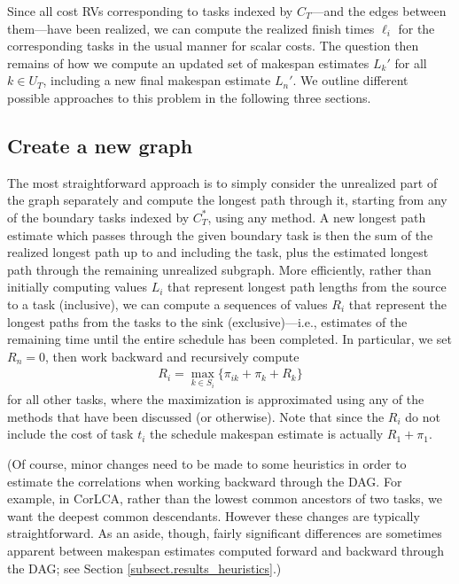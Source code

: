 \documentclass[12pt]{article}
\begin{document}
Since all cost RVs corresponding to tasks indexed by $C_T$---and the edges between them---have been realized, we can compute the realized finish times $\ell_i$ for the corresponding tasks in the usual manner for scalar costs. The question then remains of how we compute an updated set of makespan estimates $L_k'$ for all $k \in U_T$, including a new final makespan estimate $L_n'$. We outline different possible approaches to this problem in the following three sections.

\subsection{Create a new graph}
\label{subsect.remaining}

The most straightforward approach is to simply consider the unrealized part of the graph separately and compute the longest path through it, starting from any of the boundary tasks indexed by $C_T^*$, using any method. A new longest path estimate which passes through the given boundary task is then the sum of the realized longest path up to and including the task, plus the estimated longest path through the remaining unrealized subgraph. More efficiently, rather than initially computing values $L_i$ that represent longest path lengths from the source to a task (inclusive), we can compute a sequences of values $R_i$ that represent the longest paths from the tasks to the sink (exclusive)---i.e., estimates of the remaining time until the entire schedule has been completed. In particular, we set $R_n = 0$, then work backward and recursively compute  
\begin{align*}
  R_i = \max_{k \in S_i} \{ \pi_{ik} + \pi_k + R_k  \}
\end{align*}
for all other tasks, where the maximization is approximated using any of the methods that have been discussed (or otherwise). Note that since the $R_i$ do not include the cost of task $t_i$ the schedule makespan estimate is actually $R_1 + \pi_1$.

(Of course, minor changes need to be made to some heuristics in order to estimate the correlations when working backward through the DAG. For example, in CorLCA, rather than the lowest common ancestors of two tasks, we want the deepest common descendants. However these changes are typically straightforward. As an aside, though, fairly significant differences are sometimes apparent between makespan estimates computed forward and backward through the DAG; see Section \ref{subsect.results_heuristics}.) 
\end{document}
